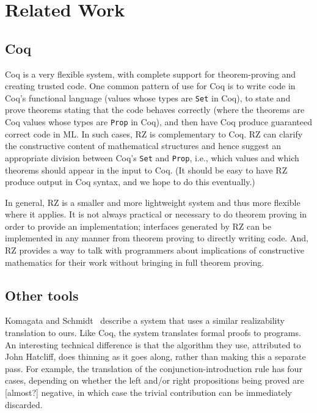 \section{Related Work}
\label{sec:related-work}

\subsection{Coq}
\label{sec:comparison-with-coq}

Coq is a very flexible system, with complete support for
theorem-proving and creating trusted code. One common pattern of use
for Coq is to write code in Coq's functional language (values whose
types are \texttt{Set} in Coq), to state and prove theorems stating
that the code behaves correctly (where the theorems are Coq values
whose types are \texttt{Prop} in Coq), and then have Coq produce
guaranteed correct code in ML. In such cases, RZ is complementary to
Coq. RZ can clarify the constructive content of mathematical
structures and hence suggest an appropriate division between Coq's
\texttt{Set} and \texttt{Prop}, i.e., which values and which theorems
should appear in the input to Coq. (It should be easy to have RZ
produce output in Coq syntax, and we hope to do this eventually.)

In general, RZ is a smaller and more lightweight system and thus more
flexible where it applies. It is not always practical or necessary to
do theorem proving in order to provide an implementation; interfaces
generated by RZ can be implemented in any manner from theorem proving
to directly writing code. And, RZ provides a way to talk with
programmers about implications of constructive mathematics for their work without bringing in
full theorem proving.


\subsection{Other tools}

Komagata and Schmidt~\cite{komagata+:tr95} describe a system that uses
a similar realizability translation to ours. Like Coq, the system
translates formal proofs to programs.
%
An interesting technical difference is that the algorithm they use,
attributed to John Hatcliff, does thinning as it goes along, rather
than making this a separate pass. For example, the translation of the
conjunction-introduction rule has four cases, depending on whether the
left and/or right propositions being proved are [almost?] negative, in
which case the trivial contribution can be immediately discarded.

